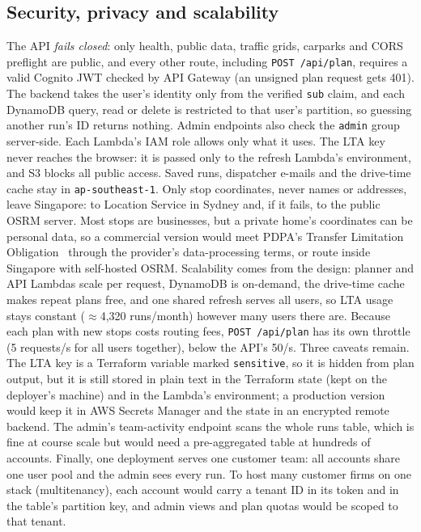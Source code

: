 \documentclass[10.5pt,a4paper]{article}
\begin{document}
\subsection{Security, privacy and scalability}
The API \emph{fails closed}: only health, public data, traffic grids, carparks and CORS preflight are public, and every other
route, including \texttt{POST /api/plan}, requires a valid Cognito JWT checked by API Gateway (an unsigned plan request gets 401).
The backend takes the user's identity only from the verified \texttt{sub} claim, and each DynamoDB query, read or delete is
restricted to that user's partition, so guessing another run's ID returns nothing. Admin endpoints also check the
\texttt{admin} group server-side. Each Lambda's IAM role allows only what it uses. The LTA key never reaches the browser:
it is passed only to the refresh Lambda's environment, and S3 blocks all public access. Saved runs, dispatcher e-mails and the
drive-time cache stay in \texttt{ap-southeast-1}. Only stop coordinates, never names or addresses, leave Singapore: to Location
Service in Sydney and, if it fails, to the public OSRM server. Most stops are businesses, but a private home's coordinates
can be personal data, so a commercial version would meet PDPA's Transfer Limitation Obligation~\cite{pdpa} through the
provider's data-processing terms, or route inside Singapore with self-hosted OSRM. Scalability comes from the design: planner and API Lambdas scale per request,
DynamoDB is on-demand, the drive-time cache makes repeat plans free, and one shared refresh serves all users, so LTA usage
stays constant ($\approx$4,320 runs/month) however many users there are. Because each plan with new stops costs routing fees, \texttt{POST /api/plan} has its own throttle (5 requests/s for all users together), below the API's 50/s.
Three caveats remain. The LTA key is a Terraform variable marked \texttt{sensitive}, so it is hidden from plan output,
but it is still stored in plain text in the Terraform state (kept on the deployer's machine) and in the Lambda's
environment; a production version would keep it in AWS Secrets Manager and the state in an encrypted remote backend. The
admin's team-activity endpoint scans the whole runs table, which is fine at course scale but would need a pre-aggregated
table at hundreds of accounts. Finally, one deployment serves one customer team: all accounts share one user pool and the
admin sees every run. To host many customer firms on one stack (multitenancy), each account would carry a tenant ID in its
token and in the table's partition key, and admin views and plan quotas would be scoped to that tenant.
\end{document}

